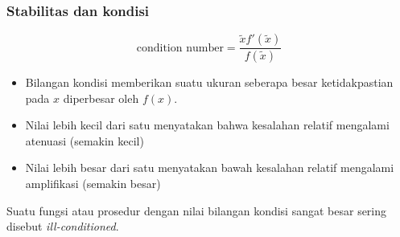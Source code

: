 \documentclass[9pt]{beamer}
\begin{document}
\begin{frame}
\frametitle{Stabilitas dan kondisi}

\begin{equation}
\text{condition number} = \frac{\tilde{x} f'(\tilde{x})}{f(\tilde{x})}
\end{equation}

\begin{itemize}
\item Bilangan kondisi memberikan suatu ukuran seberapa besar ketidakpastian pada $x$
diperbesar oleh $f(x)$.
\item Nilai lebih kecil dari satu menyatakan bahwa kesalahan relatif mengalami atenuasi
(semakin kecil)
\item Nilai lebih besar dari satu menyatakan bawah kesalahan relatif mengalami amplifikasi
(semakin besar)
\end{itemize}

Suatu fungsi atau prosedur dengan nilai bilangan kondisi sangat besar sering disebut
\textit{ill-conditioned}.

\end{frame}
\end{document}
